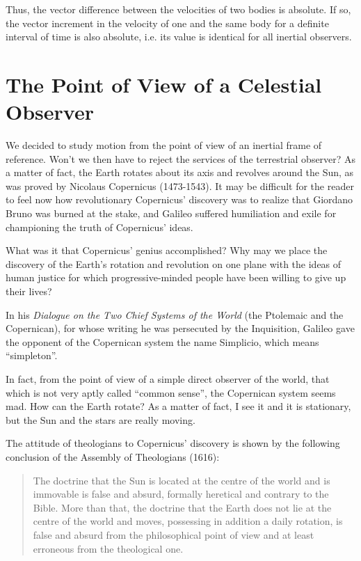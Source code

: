 Thus, the vector difference between the velocities of two bodies is absolute. If so, the vector increment in the velocity of one and the same body for a definite interval of time is also absolute, i.e. its value is identical for all inertial observers.

\section{The Point of View of a Celestial Observer}

We decided to study motion from the point of view of an inertial frame of reference. Won't we then have to reject the services of the terrestrial observer? As a matter of fact, the Earth rotates about its axis and revolves around the Sun, as was proved by Nicolaus Copernicus (1473-1543). It may be difficult for the reader to feel now how revolutionary Copernicus' discovery was to realize that Giordano Bruno was burned at the stake, and Galileo suffered humiliation and exile for championing the truth of Copernicus' ideas.

What was it that Copernicus' genius accomplished? Why may we place the discovery of the Earth's rotation and revolution on one plane with the ideas of human justice for which progressive-minded people have been willing to give up their lives?

In his \emph{Dialogue on the Two Chief Systems of the World} (the Ptolemaic and the Copernican), for whose writing he was persecuted by the Inquisition, Galileo gave the opponent of the Copernican system the name Simplicio, which means ``simpleton''.

In fact, from the point of view of a simple direct observer of the world, that which is not very aptly called ``common sense'', the Copernican system seems mad. How can the Earth rotate? As a matter of fact, I see it and it is stationary, but the Sun and the stars are really moving.

The attitude of theologians to Copernicus' discovery is shown by the following conclusion of the Assembly of Theologians (1616): \begin{quote}
The doctrine that the Sun is located at the centre of the world and is immovable is false and absurd, formally heretical and contrary to the Bible. More than that, the doctrine that the Earth does not lie at the centre of the world and moves, possessing in addition a daily rotation, is false and absurd from the philosophical point of view and at least erroneous from the theological one.
\end{quote}

